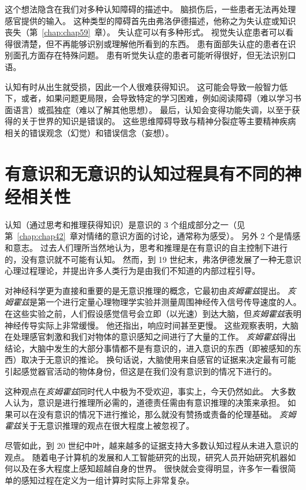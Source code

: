 这个想法隐含在我们对多种认知障碍的描述中。
脑损伤后，一些患者无法再处理感官提供的输入。
这种类型的障碍首先由弗洛伊德描述，他称之为失认症或知识丧失（第~\ref{chap:chap59}~章）。
失认症可以有多种形式。
视觉失认症患者可以看得很清楚，但不再能够识别或理解他所看到的东西。
患有面部失认症的患者在识别面孔方面存在特殊问题。
患有听觉失认症的患者可能听得很好，但无法识别口语。


认知有时从出生就受损，因此一个人很难获得知识。
这可能会导致一般智力低下，或者，如果问题更局限，会导致特定的学习困难，例如阅读障碍（难以学习书面语言）或孤独症（难以了解其他思想）。
最后，认知会变得功能失调，以至于获得的关于世界的知识是错误的。
这些思维障碍导致与精神分裂症等主要精神疾病相关的错误观念（幻觉）和错误信念（妄想）。



\section{有意识和无意识的认知过程具有不同的神经相关性}

认知（通过思考和推理获得知识）是意识的 3 个组成部分之一（见第~\ref{chap:chap42}~章对情绪的意识方面的讨论，通常称为感受）。
另外 2 个是情感和意志。
过去人们理所当然地认为，思考和推理是在有意识的自主控制下进行的，没有意识就不可能有认知。
然而，到 19 世纪末，弗洛伊德发展了一种无意识心理过程理论，并提出许多人类行为是由我们不知道的内部过程引导。


对神经科学更为直接和重要的是无意识推理的概念，它最初由\textit{亥姆霍兹}提出。
\textit{亥姆霍兹}是第一个进行定量心理物理学实验并测量周围神经传入信号传导速度的人。
在这些实验之前，人们假设感觉信号会立即（以光速）到达大脑，但\textit{亥姆霍兹}表明神经传导实际上非常缓慢。
他还指出，响应时间甚至更慢。
这些观察表明，大脑在处理感官刺激和我们对物体的意识感知之间进行了大量的工作。
\textit{亥姆霍兹}得出结论，大脑中发生的大部分事情都不是有意识的，进入意识的东西（即被感知的东西）取决于无意识的推论。
换句话说，大脑使用来自感官的证据来决定最有可能引起感觉器官活动的物体身份，但这是在我们没有意识到的情况下进行的。


这种观点在\textit{亥姆霍兹}同时代人中极为不受欢迎，事实上，今天仍然如此。
大多数人认为，意识是进行推理所必需的，道德责任需由有意识推理的决策来承担。
如果可以在没有意识的情况下进行推论，那么就没有赞扬或责备的伦理基础。
\textit{亥姆霍兹}关于无意识推理的观点在很大程度上被忽视了。



尽管如此，到 20 世纪中叶，越来越多的证据支持大多数认知过程从未进入意识的观点。
随着电子计算机的发展和人工智能研究的出现，研究人员开始研究机器如何以及在多大程度上感知超越自身的世界。
很快就会变得明显，许多乍一看很简单的感知过程在定义为一组计算时实际上非常复杂。


